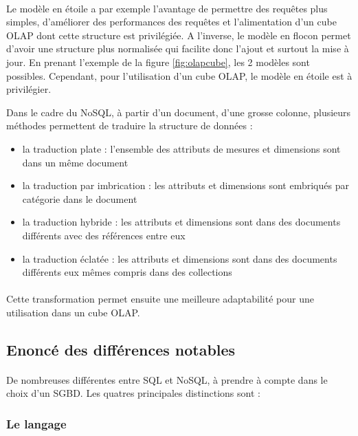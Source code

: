 \paragraph{}Le modèle en étoile a par exemple l'avantage de permettre des requêtes plus simples, d'améliorer des performances des requêtes et l'alimentation d'un cube OLAP dont cette structure est privilégiée. A l'inverse, le modèle en flocon  permet d'avoir une structure plus normalisée  qui facilite donc l'ajout et surtout la mise à jour. En prenant l'exemple de la figure \ref{fig:olapcube}, les 2 modèles sont possibles. Cependant, pour l'utilisation d'un cube OLAP, le modèle en étoile est à privilégier.

Dans le cadre du NoSQL, à partir d'un document, d'une grosse colonne, plusieurs méthodes permettent de traduire la structure de données  \supercite{sgbd} :
\begin{itemize}[label=\textbullet]
    \item la traduction plate : l'ensemble des attributs de mesures et dimensions sont dans un même document
    \item la traduction par imbrication : les attributs et dimensions sont embriqués par catégorie dans le document
    \item la traduction hybride : les attributs et dimensions sont dans des documents différents avec des références entre eux
    \item la traduction éclatée : les attributs et dimensions sont dans des documents différents eux mêmes compris dans des collections
\end{itemize}
\paragraph{}Cette transformation permet ensuite une meilleure adaptabilité pour une utilisation dans un cube OLAP.

\subsection{Enoncé des différences notables}
\paragraph{}De nombreuses différentes entre SQL et NoSQL, à prendre à compte dans le choix d’un \acrshort{SGBD}. Les quatres principales distinctions sont :

\subsubsection{Le langage}
